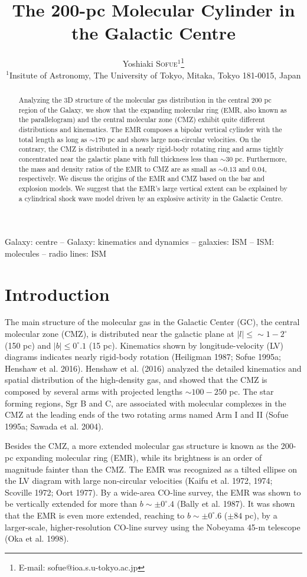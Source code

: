 \documentclass[useAMS,usenatbib]{mn2e}
\title{The 200-pc Molecular Cylinder in the Galactic Centre}
\author[Yoshiaki SOFUE]{Yoshiaki \textsc{Sofue}$^{1}$\thanks{E-mail: sofue@ioa.s.u-tokyo.ac.jp}\\
$^1$Insitute of Astronomy, The University of Tokyo, Mitaka, Tokyo 181-0015, Japan }
\def\deg{^\circ}\def\Deg{^\circ}
\begin{document}
 
\date{ } 

\maketitle  

\begin{abstract} 
{
Analyzing the 3D structure of the molecular gas distribution in the central 200 pc region of the Galaxy, we show that the expanding molecular ring (EMR, also known as the parallelogram) and the central molecular zone (CMZ) exhibit quite different distributions and kinematics. The EMR composes a bipolar vertical cylinder with the total length as long as $\sim 170$ pc and shows large non-circular velocities. On the contrary, the CMZ is distributed in a nearly rigid-body rotating ring and arms tightly concentrated near the galactic plane with full thickness less than $\sim 30$ pc. Furthermore, the mass and density ratios of the EMR to CMZ are as small as $\sim 0.13$ and 0.04, respectively. We discuss the origins of the EMR and CMZ based on the bar and explosion models. We suggest that the EMR's large vertical extent can be explained by a cylindrical shock wave model driven by an explosive activity in the Galactic Centre. 
}
\end{abstract}
\begin{keywords}
Galaxy: centre -- Galaxy: kinematics and dynamics -- galaxies: ISM -- ISM: molecules -- radio lines: ISM
\end{keywords}

\section{Introduction}
 
The main structure of the molecular gas in the Galactic Center (GC), the central molecular zone (CMZ), is distributed near the galactic plane at $|l| \le \sim 1-2\deg$ (150 pc) and $|b|\le 0\deg.1$ (15 pc). Kinematics shown by longitude-velocity (LV) diagrams indicates nearly rigid-body rotation (Heiligman 1987; Sofue 1995a; Henshaw et al. 2016). Henshaw et al. (2016) analyzed the detailed kinematics and spatial distribution of the high-density gas, and showed that the CMZ is composed by several arms with projected lengths $\sim 100-250$ pc. The star forming regions, Sgr B and C, are associated with molecular complexes in the CMZ at the leading ends of the two rotating arms named Arm I and II (Sofue 1995a; Sawada et al. 2004).

Besides the CMZ, a more extended molecular gas structure is known as the 200-pc expanding molecular ring (EMR), while its brightness is an order of magnitude fainter than the CMZ. The EMR was recognized as a tilted ellipse on the LV diagram with large non-circular velocities (Kaifu et al. 1972, 1974; Scoville 1972; Oort 1977). By a wide-area CO-line survey, the EMR was shown to be vertically extended for more than $b\sim \pm 0\deg.4$ (Bally et al. 1987). It was shown that the EMR is even more extended, reaching to $b \sim \pm 0\deg.6$ ($\pm 84$ pc), by a larger-scale, higher-resolution CO-line survey using the Nobeyama 45-m telescope (Oka et al. 1998). 
\end{document}
